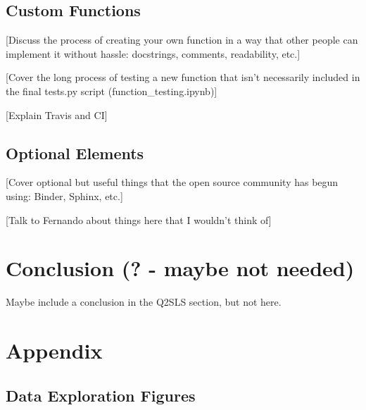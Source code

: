 \documentclass[12pt]{article}
\begin{document}
\subsection{Custom Functions}
\textcolor{BrickRed}{[Discuss the process of creating your own function in  a way that other people can implement it without hassle: docstrings, comments, readability, etc.]}

\textcolor{BrickRed}{[Cover the long process of testing a new function that isn't necessarily included in the final tests.py script (function\_testing.ipynb)]}

\textcolor{BrickRed}{[Explain Travis and CI]}

\subsection{Optional Elements}
\textcolor{BrickRed}{[Cover optional but useful things that the open source community has begun using: Binder, Sphinx, etc.]}

\textcolor{BrickRed}{[Talk to Fernando about things here that I wouldn't think of]}


\newpage
\section{Conclusion (? - maybe not needed)}
Maybe include a conclusion in the Q2SLS section, but not here.

\newpage
\section{Appendix}

\subsection{Data Exploration Figures}
\end{document}
